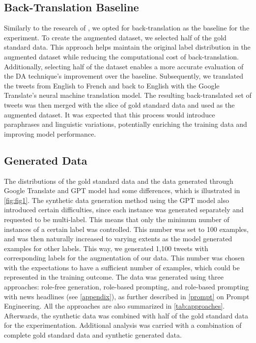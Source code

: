 \documentclass[manuscript]{clv3}
\begin{document}
\subsection{Back-Translation Baseline}
Similarly to the research of \citet{van-nooten-daelemans-2023-improving}, we opted for back-translation as the baseline for the experiment. To create the augmented dataset, we selected half of the gold standard data. This approach helps maintain the original label distribution in the augmented dataset while reducing the computational cost of back-translation. Additionally, selecting half of the dataset enables a more accurate evaluation of the DA technique's improvement over the baseline. Subsequently, we translated the tweets from English to French and back to English with the Google Translate's neural machine translation model. The resulting back-translated set of tweets was then merged with the slice of gold standard data and used as the augmented dataset. It was expected that this process would introduce paraphrases and linguistic variations, potentially enriching the training data and improving model performance.

\subsection{Generated Data}
The distributions of the gold standard data and the data generated through Google Translate and GPT model had some differences, which is illustrated in \autoref{fig:fig1}. The synthetic data generation method using the GPT model also introduced certain difficulties, since each instance was generated separately and requested to be multi-label. This means that only the minimum number of instances of a certain label was controlled. This number was set to 100 examples, and was then naturally increased to varying extents as the model generated examples for other labels. This way, we generated 1,100 tweets with corresponding labels for the augmentation of our data. This number was chosen with the expectations to have a sufficient number of examples, which could be represented in the training outcome. The data was generated using three approaches: role-free generation, role-based prompting, and role-based prompting with news headlines (see \autoref{appendix}), as further described in \autoref{prompt} on Prompt Engineering. All the approaches are also summarized in \autoref{tab:approaches}. Afterwards, the synthetic data was combined with half of the gold standard data for the experimentation. Additional analysis was carried with a combination of complete gold standard data and synthetic generated data.
\end{document}
